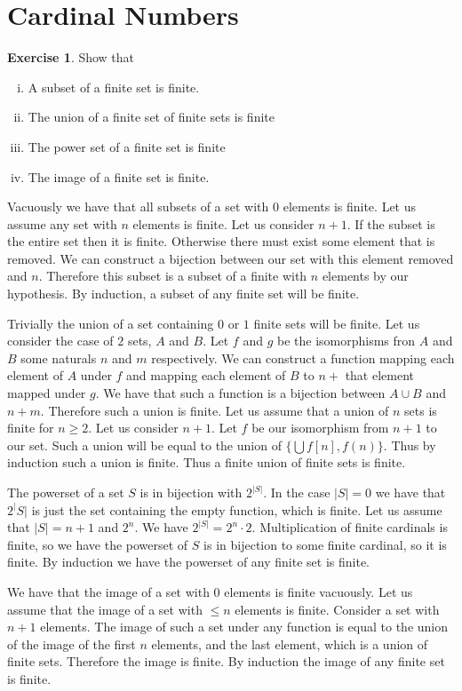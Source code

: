 \documentclass{article}
\theoremstyle{definition}
\newtheorem{exer}{Exercise}[section]
\newcommand{\abs}[1]{\lvert#1\rvert}
\newlength{\defparindent}
\newenvironment{answer}
    {\begin{mdframed}[backgroundcolor=gray!15, linewidth=0pt] \setlength{\parindent}{\defparindent}}
    {\end{mdframed}}
\begin{document}
\newpage

\section{Cardinal Numbers}

\begin{exer}
    Show that 
    \begin{enumerate}[(i)]
        \item A subset of a finite set is finite.
        \item The union of a finite set of finite sets is finite
        \item The power set of a finite set is finite
        \item The image of a finite set is finite.
    \end{enumerate}
    \begin{answer}
        Vacuously we have that all subsets of a set with $0$ elements is finite. Let us assume any set with $n$ elements is finite. Let us consider $n + 1$. If the subset is the entire set then it is finite. Otherwise there must exist some element that is removed. We can construct a bijection between our set with this element removed and $n$. Therefore this subset is a subset of a finite with $n$ elements by our hypothesis. By induction, a subset of any finite set will be finite.

        Trivially the union of a set containing $0$ or $1$ finite sets will be finite. Let us consider the case of $2$ sets, $A$ and $B$. Let $f$ and $g$ be the isomorphisms fron $A$ and $B$ some naturals $n$ and $m$ respectively. We can construct a function mapping each element of $A$ under $f$ and mapping each element of $B$ to $n +$ that element mapped under $g$. We have that such a function is a bijection between $A \cup B$ and $n + m$. Therefore such a union is finite.  Let us assume that a union of $n$ sets is finite for $n \ge 2$. Let us consider $n + 1$. Let $f$ be our isomorphism from $n + 1$ to our set. Such a union will be equal to the union of $\{\bigcup f[n], f(n)\}$. Thus by induction such a union is finite. Thus a finite union of finite sets is finite.

        The powerset of a set $S$ is in bijection with $2^{\abs{S}}$. In the case $\abs{S} = 0$ we have that $2^\abs{S}$ is just the set containing the empty function, which is finite. Let us assume that $\abs{S} = n + 1$ and $2^{n}$. We have $2^{\abs{S}} = 2^n \cdot 2$. Multiplication of finite cardinals is finite, so we have the powerset of $S$ is in bijection to some finite cardinal, so it is finite. By induction we have the powerset of any finite set is finite.

        We have that the image of a set with $0$ elements is finite vacuously. Let us assume that the image of a set with $\le n$ elements is finite. Consider a set with $n + 1$ elements. The image of such a set under any function is equal to the union of the image of the first $n$ elements, and the last element, which is a union of finite sets. Therefore the image is finite. By induction the image of any finite set is finite.
    \end{answer}
\end{exer}
\end{document}
